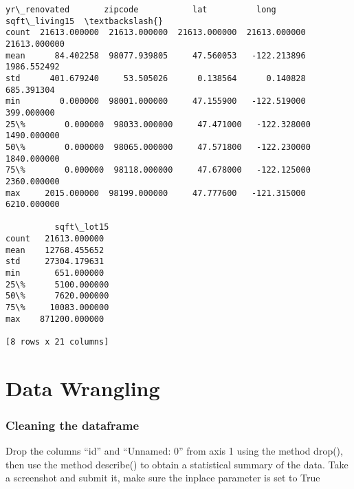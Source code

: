 \documentclass[11pt]{article}
\begin{document}
\begin{tcolorbox}[breakable, size=fbox, boxrule=.5pt, pad at break*=1mm, opacityfill=0]
\begin{Verbatim}[commandchars=\\\{\}]
       yr\_renovated       zipcode           lat          long  sqft\_living15  \textbackslash{}
count  21613.000000  21613.000000  21613.000000  21613.000000   21613.000000
mean      84.402258  98077.939805     47.560053   -122.213896    1986.552492
std      401.679240     53.505026      0.138564      0.140828     685.391304
min        0.000000  98001.000000     47.155900   -122.519000     399.000000
25\%        0.000000  98033.000000     47.471000   -122.328000    1490.000000
50\%        0.000000  98065.000000     47.571800   -122.230000    1840.000000
75\%        0.000000  98118.000000     47.678000   -122.125000    2360.000000
max     2015.000000  98199.000000     47.777600   -121.315000    6210.000000

          sqft\_lot15
count   21613.000000
mean    12768.455652
std     27304.179631
min       651.000000
25\%      5100.000000
50\%      7620.000000
75\%     10083.000000
max    871200.000000

[8 rows x 21 columns]
\end{Verbatim}
\end{tcolorbox}
\normalsize       
    \hypertarget{data-wrangling}{%
\section{Data Wrangling}\label{data-wrangling}}

    \hypertarget{cleaning-the-dataframe}{%
\subsubsection{Cleaning the dataframe}\label{cleaning-the-dataframe}}

Drop the columns ``id'' and ``Unnamed: 0'' from axis 1 using the method
drop(), then use the method describe() to obtain a statistical summary
of the data. Take a screenshot and submit it, make sure the inplace
parameter is set to True
\end{document}
